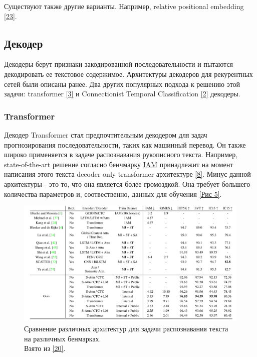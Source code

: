 Существуют также другие варианты. Например, relative positional embedding \hyperlink{cite.Sha18}{[23]}.

\subsection{Декодер}
Декодеры берут признаки закодированной последовательности и пытаются декодировать ее текстовое содержимое. Архитектуры декодеров для рекурентных сетей были описаны ранее. Два других популярных подхода к решению этой задачи: transformer \hyperlink{cite.Vas17}{[3]} и Connectionist Temporal Classification \hyperlink{cite.Gra06}{[2]} декодеры.

\subsubsection{Transformer}
Декодер Transformer стал предпочтительным декодером для задач прогнозирования последовательности, таких как машинный перевод. Он также широко применяется в задаче распознавания рукописного текста. Например, state-of-the-art решение согласно бенчмарку \href{https://paperswithcode.com/sota/handwritten-text-recognition-on-iam}{IAM} принадлежит на момент написания этого текста decoder-only transformer архитектуре \hyperlink{cite.Mas23}{[8]}. Минус данной архитектуры - это то, что она является более громоздкой. Она требует большего количества параметров и, соотвественно, данных для обучения \hyperlink{image5}{[Рис 5]}.

\begin{figure}
    \centering
    \includegraphics[scale=0.25]{./images/competition_all.png}
    \caption{\protect\hypertarget{image6}{Сравнение различных архитектур для задачи распознавания текста на различных бенмарках. \\ Взято из \protect\hyperlink{cite.Her21}{[20]}}.}
\end{figure}

